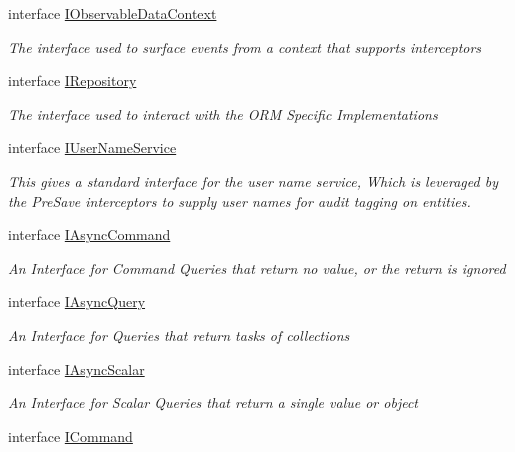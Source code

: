 \begin{DoxyCompactItemize}
interface \hyperlink{interface_highway_1_1_data_1_1_interfaces_1_1_i_observable_data_context}{I\-Observable\-Data\-Context}
\begin{DoxyCompactList}\small\item\em The interface used to surface events from a context that supports interceptors \end{DoxyCompactList}\item 
interface \hyperlink{interface_highway_1_1_data_1_1_interfaces_1_1_i_repository}{I\-Repository}
\begin{DoxyCompactList}\small\item\em The interface used to interact with the O\-R\-M Specific Implementations \end{DoxyCompactList}\item 
interface \hyperlink{interface_highway_1_1_data_1_1_interfaces_1_1_i_user_name_service}{I\-User\-Name\-Service}
\begin{DoxyCompactList}\small\item\em This gives a standard interface for the user name service, Which is leveraged by the Pre\-Save interceptors to supply user names for audit tagging on entities. \end{DoxyCompactList}\item 
interface \hyperlink{interface_highway_1_1_data_1_1_interfaces_1_1_i_async_command}{I\-Async\-Command}
\begin{DoxyCompactList}\small\item\em An Interface for Command Queries that return no value, or the return is ignored \end{DoxyCompactList}\item 
interface \hyperlink{interface_highway_1_1_data_1_1_interfaces_1_1_i_async_query-g}{I\-Async\-Query}
\begin{DoxyCompactList}\small\item\em An Interface for Queries that return tasks of collections \end{DoxyCompactList}\item 
interface \hyperlink{interface_highway_1_1_data_1_1_interfaces_1_1_i_async_scalar-g}{I\-Async\-Scalar}
\begin{DoxyCompactList}\small\item\em An Interface for Scalar Queries that return a single value or object \end{DoxyCompactList}\item 
interface \hyperlink{interface_highway_1_1_data_1_1_interfaces_1_1_i_command}{I\-Command}

\end{DoxyCompactItemize}
